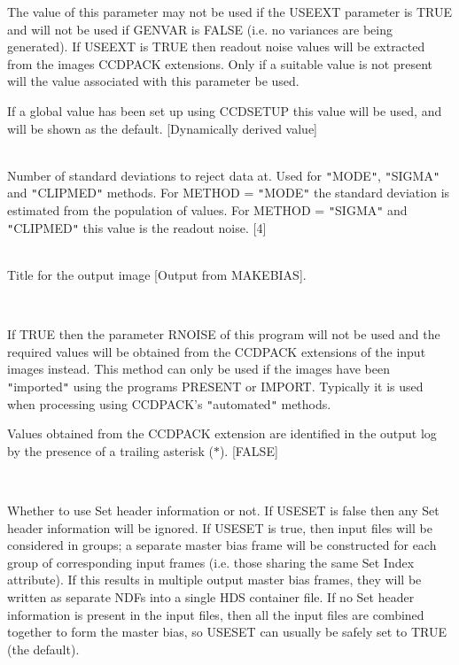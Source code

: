 \documentclass[twoside,11pt]{article}
\newcommand{\htmlref}[2]{#1}
\renewcommand{\_}{\texttt{\symbol{95}}}
\newcommand{\qt}[1]{{\tt "}#1{\tt "}}
\newcommand{\xroutine}[1]{\htmlref{{\sc #1}}{#1}}
\newcommand{\sstsubsection}[1]{ \item[{#1}] \mbox{} \\}
\newcommand{\sstsubsection}[1]{\item[{#1}]}
\begin{document}
{{{         The value of this parameter may not be used if the USEEXT
         parameter is TRUE and will not be used if GENVAR is FALSE
         (i.e. no variances are being generated). If USEEXT is TRUE
         then readout noise values will be extracted from the images
         CCDPACK extensions. Only if a suitable value is not present
         will the value associated with this parameter be used.

         If a global value has been set up using \xroutine{CCDSETUP} this value
         will be used, and will be shown as the default.
         [Dynamically derived value]
      }
      \sstsubsection{
         SIGMAS = \_REAL (Read)
      } {
         Number of standard deviations to reject data at. Used for
         \qt{MODE}, \qt{SIGMA} and \qt{CLIPMED} methods. For METHOD =
         \qt{MODE} the standard deviation is estimated from the
         population of values. For METHOD = \qt{SIGMA} and
         \qt{CLIPMED} this value is the readout noise.
         [4]
      }
      \sstsubsection{
         TITLE = LITERAL (Read)
      } {
         Title for the output image
         [Output from MAKEBIAS].
      }
      \sstsubsection{
         USEEXT = \_LOGICAL (Read)
      } {
         If TRUE then the parameter RNOISE of this program will not
         be used and the required values will be obtained from the
         CCDPACK extensions of the input images instead. This method can
         only be used if the images have been \qt{imported} using the
         programs \xroutine{PRESENT} or \xroutine{IMPORT}. Typically it is used when
         processing using CCDPACK's \qt{automated} methods.

         Values obtained from the CCDPACK extension are identified in
         the output log by the presence of a trailing asterisk ($*$).
         [FALSE]
      }
      \sstsubsection{
         USESET = \_LOGICAL (Read)
      } {
         Whether to use Set header information or not.  If USESET is
         false then any Set header information will be ignored.
         If USESET is true, then input files will be considered in
         groups; a separate master bias frame will be constructed for
         each group of corresponding input frames (i.e. those sharing
         the same Set Index attribute).  If this results in multiple
         output master bias frames, they will be written as separate
         NDFs into a single HDS container file.  If no Set header
         information is present in the input files, then all the
         input files are combined together to form the master bias, 
         so USESET can usually be safely set to TRUE (the default).

}}}
\end{document}
